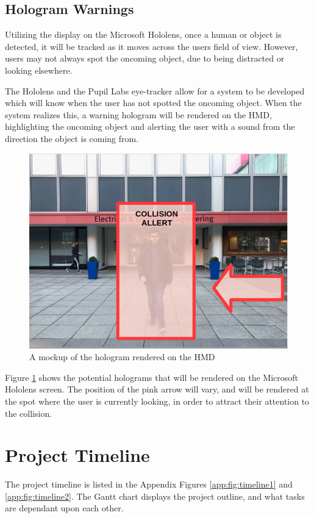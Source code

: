 \documentclass[12pt,a4paper]{report}
\begin{document}
\subsection{Hologram Warnings}
Utilizing the display on the Microsoft Hololens, once a human or object is detected, it will be tracked as it moves across the users field of view. However, users may not always spot the oncoming object, due to being distracted or looking elsewhere.

The Hololens and the Pupil Labs eye-tracker allow for a system to be developed which will know when the user has not spotted the oncoming object. When the system realizes this, a warning hologram will be rendered on the HMD, highlighting the oncoming object and alerting the user with a sound from the direction the object is coming from.

\begin{figure}[ht!]
	\begin{center}
		\includegraphics[width=.55\linewidth]{Images/Implementation/AR_Hologram_Render.png}
		\caption{A mockup of the hologram rendered on the HMD}
		\label{fig:HMD_Render_Mockup}
	\end{center}
\end{figure}

Figure \ref{fig:HMD_Render_Mockup} shows the potential holograms that will be rendered on the Microsoft Hololens screen. The position of the pink arrow will vary, and will be rendered at the spot where the user is currently looking, in order to attract their attention to the collision.


\section{Project Timeline}
The project timeline is listed in the Appendix Figures \ref{app:fig:timeline1} and \ref{app:fig:timeline2}. The Gantt chart displays the project outline, and what tasks are dependant upon each other.
\end{document}
